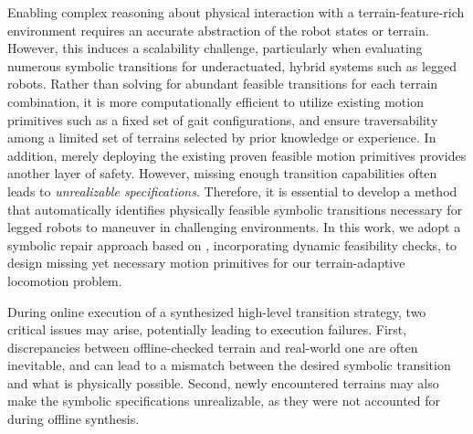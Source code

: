 \documentclass[letterpaper, 10 pt, conference]{ieeeconf}
\begin{document}
Enabling complex reasoning about physical interaction with a terrain-feature-rich environment requires an accurate abstraction of the robot states or terrain. However, this induces a scalability challenge, particularly when evaluating numerous symbolic transitions for underactuated, hybrid systems such as legged robots. Rather than solving for abundant feasible transitions \cite{bhatia2010sampling,liu2013synthesis,maly2013iterative,gu2022reactive} for each terrain combination, it is more computationally efficient to utilize existing motion primitives such as a fixed set of gait configurations, and ensure traversability among a limited set of terrains selected by prior knowledge or experience. In addition, merely deploying the existing proven feasible motion primitives provides another layer of safety.
However, missing enough transition capabilities
often leads to \textit{unrealizable specifications}. Therefore, it is essential to develop a method that automatically identifies physically feasible symbolic transitions necessary for legged robots to maneuver in challenging environments. In this work, we adopt a symbolic repair approach based on \cite{pacheck2022physically}, incorporating dynamic feasibility checks, to design missing yet necessary motion primitives for our terrain-adaptive locomotion problem.

During online execution of a synthesized high-level transition strategy, two critical issues may arise, potentially leading to execution failures. First, discrepancies between offline-checked terrain and real-world one are often inevitable, and can lead to a mismatch between the desired symbolic transition and what is physically possible. Second, newly encountered terrains may also make the symbolic specifications unrealizable, as they were not accounted for during offline synthesis. %
\end{document}
